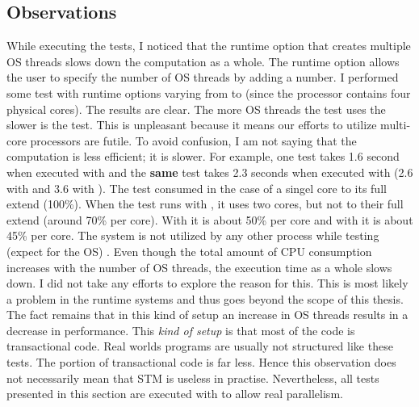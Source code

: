 \subsection{Observations}
While executing the tests, I noticed that the runtime option  that creates multiple OS threads slows down the 
computation as a whole. The runtime option  allows the user to specify the number of OS threads by adding a 
number. I performed some test with runtime options varying from  to  (since the processor contains four 
physical cores). The results are clear. The more OS threads the test uses the slower is the test. This is unpleasant 
because it means our efforts to utilize multi-core processors are futile. To avoid confusion, I am not saying that 
the computation is less efficient; it is slower. For example, one test takes 1.6 second when executed with 
and the \textbf{same} test takes 2.3 seconds when executed with  (2.6 with  and 3.6 with ).
The test consumed in the case of  a singel core to its full extend (100\%). When the test runs with ,
it uses two cores, but not to their full extend (around 70\% per core). With  it is about 50\% per core and 
with  it is about 45\% per core. The system is not utilized by any other process while testing (expect for the 
OS) . Even though the total amount of CPU consumption increases with the number of OS threads, the execution time 
as a whole slows down. I did not take any efforts to explore the reason for this. This is most likely a problem 
in the runtime systems and thus goes beyond the scope of this thesis. The fact remains that in this kind of
setup an increase in OS threads results in a decrease in performance. This \textit{kind of setup} is that most of 
the code is transactional code. Real worlds programs are usually not structured like these tests. The portion
of transactional code is far less. Hence this observation does not necessarily mean that STM is useless in 
practise. Nevertheless, all tests presented in this section are executed with  to allow real parallelism. 

